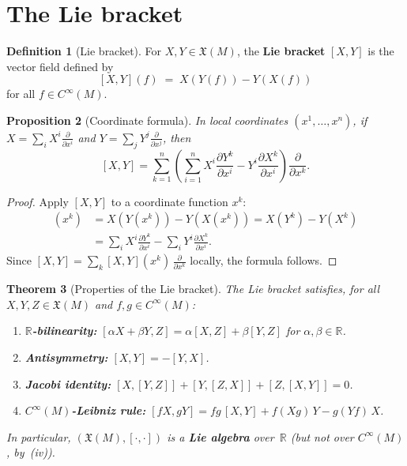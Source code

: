 \documentclass[12pt,a4paper,openany]{book}
\newtheorem{theorem}{Theorem}[section]
\newtheorem{proposition}[theorem]{Proposition}
\theoremstyle{definition}
\newtheorem{definition}[theorem]{Definition}
\theoremstyle{remark}
\newcommand{\R}{\mathbb{R}}
\begin{document}
\section{The Lie bracket}\label{sec:lie-bracket}

\begin{definition}[Lie bracket]\label{def:lie-bracket}%
For $X, Y \in \mathfrak{X}(M)$, the \textbf{Lie bracket} $[X, Y]$ is
the vector field defined by
\[
  [X, Y](f) \;=\; X(Y(f)) - Y(X(f))
\]
for all $f \in C^\infty(M)$.
\end{definition}

\begin{proposition}[Coordinate formula]\label{prop:lie-bracket-coords}%
In local coordinates $(x^1, \dots, x^n)$, if
$X = \sum_i X^i \frac{\partial}{\partial x^i}$ and
$Y = \sum_j Y^j \frac{\partial}{\partial x^j}$, then
\[
  [X, Y] = \sum_{k=1}^n \left(
    \sum_{i=1}^n X^i \frac{\partial Y^k}{\partial x^i}
    - Y^i \frac{\partial X^k}{\partial x^i}
  \right) \frac{\partial}{\partial x^k}.
\]
\end{proposition}

\begin{proof}
Apply $[X, Y]$ to a coordinate function $x^k$:
\begin{align*}
  [X, Y](x^k)
  &= X(Y(x^k)) - Y(X(x^k))
  = X(Y^k) - Y(X^k) \\
  &= \sum_i X^i \frac{\partial Y^k}{\partial x^i}
   - \sum_i Y^i \frac{\partial X^k}{\partial x^i}.
\end{align*}
Since $[X,Y] = \sum_k [X,Y](x^k)\, \frac{\partial}{\partial x^k}$
locally, the formula follows.
\end{proof}

\begin{theorem}[Properties of the Lie bracket]\label{thm:lie-bracket-props}%
The Lie bracket satisfies, for all $X, Y, Z \in \mathfrak{X}(M)$ and
$f, g \in C^\infty(M)$:
\begin{enumerate}[label=(\roman*)]
  \item \textbf{$\R$-bilinearity:}
    $[\alpha X + \beta Y, Z] = \alpha[X, Z] + \beta[Y, Z]$ for
    $\alpha, \beta \in \R$.
  \item \textbf{Antisymmetry:} $[X, Y] = -[Y, X]$.
  \item \textbf{Jacobi identity:}
    $[X, [Y, Z]] + [Y, [Z, X]] + [Z, [X, Y]] = 0$.
  \item \textbf{$C^\infty(M)$-Leibniz rule:}
    $[fX, gY] = fg\,[X, Y] + f(Xg)\,Y - g(Yf)\,X$.
\end{enumerate}
In particular, $(\mathfrak{X}(M), [\cdot,\cdot])$ is a
\textbf{Lie algebra} over~$\R$ (but not over
$C^\infty(M)$, by~(iv)).
\end{theorem}
\end{document}
